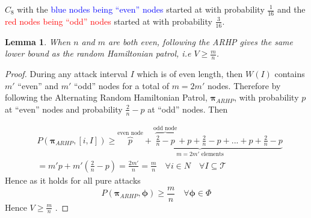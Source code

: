 \documentclass[a4paper,10pt]{article}
\newtheorem{lemma}[theorem]{Lemma}
\theoremstyle{definition}
\theoremstyle{definition}
\theoremstyle{remark}
\theoremstyle{definition}
\begin{document}
\begin{myfigure}
\begin{center}
\end{center}
\caption{$C_{8}$ with the \textcolor{blue}{blue nodes being ``even'' nodes} started at with probability $\frac{1}{16}$ and the \textcolor{red}{red nodes being ``odd'' nodes} started at with probability $\frac{3}{16}$.}
\end{myfigure}

\begin{lemma}
When $n$ and $m$ are both even, following the ARHP gives the same lower bound as the random Hamiltonian patrol, i.e $V \geq \frac{m}{n}$.
\end{lemma}

\begin{proof}
During any attack interval $I$ which is of even length, then $W(I)$ contains $m'$ ``even'' and $m'$ ``odd'' nodes for a total of $m=2m'$ nodes. Therefore by following the Alternating Random Hamiltonian Patrol, $\pmb{\pi}_{ARHP}$, with probability $p$ at ``even'' nodes and probability $\frac{2}{n}-p$ at ``odd'' nodes. Then

\begin{align*}
&P(\bm{\pi}_{ARHP},[i,I]) \geq \underbrace{\overbrace{p}^{\text{even node}}+\overbrace{\frac{2}{n}-p}^{\text{odd node}}+p+\frac{2}{n}-p+...+p+\frac{2}{n}-p}_{m=2m' \text{ elements}} \\
&=m' p+m'(\frac{2}{n}-p)=\frac{2m'}{n}=\frac{m}{n} \quad \forall i \in N \quad \forall I \subseteq \mathcal{T}
\end{align*}
Hence as it holds for all pure attacks
$$P(\bm{\pi}_{ARHP},\bm{\phi}) \geq \frac{m}{n} \quad \forall \bm{\phi} \in \Phi$$
Hence $V \geq \frac{m}{n}$ .
\end{proof}
\end{document}
